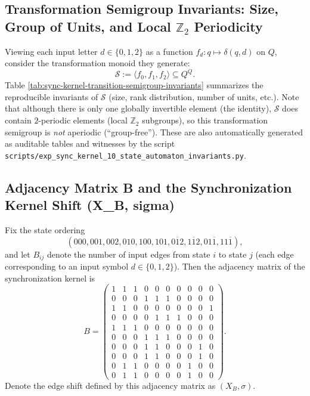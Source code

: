 \subsection{Transformation Semigroup Invariants: Size, Group of Units, and Local \texorpdfstring{$\mathbb{Z}_2$}{Z2} Periodicity}\label{app:sync-kernel-semigroup}
Viewing each input letter $d\in\{0,1,2\}$ as a function $f_d:q\mapsto\delta(q,d)$ on $Q$, consider the transformation monoid they generate:
\[
\mathcal{S}:=\langle f_0,f_1,f_2\rangle\subseteq Q^Q.
\]
Table \ref{tab:sync-kernel-transition-semigroup-invariants} summarizes the reproducible invariants of $\mathcal{S}$ (size, rank distribution, number of units, etc.).
Note that although there is only one globally invertible element (the identity), $\mathcal{S}$ does contain $2$-periodic elements (local $\mathbb{Z}_2$ subgroups), so this transformation semigroup is \emph{not} aperiodic (``group-free'').
These are also automatically generated as auditable tables and witnesses by the script \texttt{scripts/exp\_sync\_kernel\_10\_state\_automaton\_invariants.py}.



\subsection{Adjacency Matrix B and the Synchronization Kernel Shift (X\_B, sigma)}\label{app:sync-kernel-basic}
Fix the state ordering
\[
(000,001,002,010,100,101,0\overline{1}2,1\overline{1}2,01\overline{1},11\overline{1}),
\]
and let $B_{ij}$ denote the number of input edges from state $i$ to state $j$ (each edge corresponding to an input symbol $d\in\{0,1,2\}$). Then the adjacency matrix of the synchronization kernel is
\[
B=
\begin{pmatrix}
1&1&1&0&0&0&0&0&0&0\\
0&0&0&1&1&1&0&0&0&0\\
1&1&0&0&0&0&0&0&0&1\\
0&0&0&0&1&1&1&0&0&0\\
1&1&1&0&0&0&0&0&0&0\\
0&0&0&1&1&1&0&0&0&0\\
0&0&0&1&1&0&0&0&1&0\\
0&0&0&1&1&0&0&0&1&0\\
0&1&1&0&0&0&0&1&0&0\\
0&1&1&0&0&0&0&1&0&0
\end{pmatrix}.
\]
Denote the edge shift defined by this adjacency matrix as $(X_B,\sigma)$.

